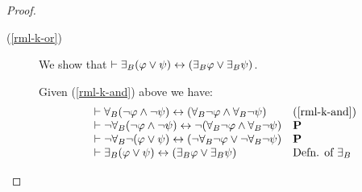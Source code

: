 \begin{proof}
\begin{description}
    \item[(\ref{rml-k-or})]
    We show that $\vdash {\exists_{B}} (\varphi \lor \psi) \leftrightarrow ({\exists_{B}} \varphi \lor {\exists_{B}} \psi)$.

    Given (\ref{rml-k-and}) above we have:
    $$
    \begin{array}{ll}
        \vdash {\forall_{B}} (\lnot \varphi \land \lnot \psi) \leftrightarrow ({\forall_{B}} \lnot \varphi \land {\forall_{B}} \lnot \psi) & \text{(\ref{rml-k-and})}\\
        \vdash \lnot {\forall_{B}} (\lnot \varphi \land \lnot \psi) \leftrightarrow \lnot ({\forall_{B}} \lnot \varphi \land {\forall_{B}} \lnot \psi) & \text{{\bf P}}\\
        \vdash \lnot {\forall_{B}} \lnot (\varphi \lor \psi) \leftrightarrow (\lnot {\forall_{B}} \lnot \varphi \lor \lnot {\forall_{B}} \lnot \psi) & \text{{\bf P}}\\
        \vdash {\exists_{B}} (\varphi \lor \psi) \leftrightarrow ({\exists_{B}} \varphi \lor {\exists_{B}} \psi) & \text{Defn. of ${\exists_{B}}$}
    \end{array}
    $$


\end{description}
\end{proof}
